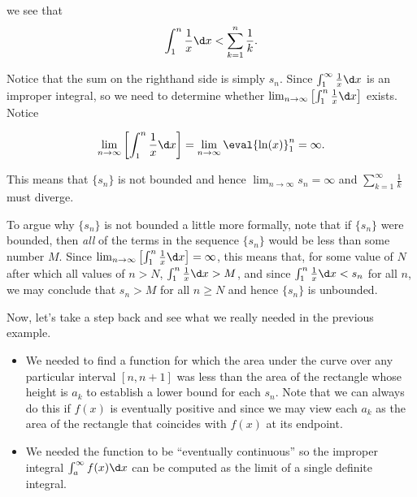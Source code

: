 \documentclass{ximera}
\begin{document}
\begin{model}
\begin{image}
\end{image}
we see that
\[
\int_1^n \frac{1}{x} \d x < \sum_{k=1}^n \frac{1}{k}.
\]

Notice that the sum on the righthand side is simply $s_n$.  Since $\int_1^{\infty} \frac{1}{x} \d x$ is an improper integral, so we need to determine whether $\lim_{n \to \infty} \left[ \int_1^n \frac{1}{x} \d x \right]$ exists.  Notice

\[
\lim_{n \to \infty} \left[ \int_1^n \frac{1}{x} \d x \right] = \lim_{n \to \infty} \eval{\ln(x)}_1^n = \infty. 
\]

This means that $\{s_n\}$ is not bounded and hence $\lim_{n \to \infty} s_n = \infty$ and $\sum_{k=1}^{\infty} \frac{1}{k}$ must diverge.  

\begin{remark}
To argue why $\{s_n\}$ is not bounded a little more formally, note that if $\{s_n\}$ were bounded, then \emph{all} of the terms in the sequence $\{s_n\}$ would be less than some number $M$.  Since $\lim_{n \to \infty} \left[ \int_1^n \frac{1}{x} \d x \right] =  \infty$, this means that, for some value of $N$ after which all values of $n>N$, $ \int_1^n \frac{1}{x} \d x > M$, and since $\int_1^n \frac{1}{x} \d x < s_n$ for all $n$, we may conclude that $s_n >M$ for all $n\geq N$ and hence $\{s_n\}$ is unbounded.
\end{remark}

\end{model}

Now, let's take a step back and see what we really needed in the previous example.

\begin{itemize}
\item We needed to find a function for which the area under the curve over any particular interval $[n,n+1]$ was less than the area of the rectangle whose height is $a_k$ to establish a lower bound for each $s_n$.  Note that we can always do this if $f(x)$ is eventually positive and  since we may view each $a_k$ as the area of the rectangle that coincides with $f(x)$ at its  endpoint.
\item We needed the function to be ``eventually continuous'' so the improper integral $\int_{a}^{\infty} f(x) \d x$ can be computed as the limit of a single definite integral.
\end{itemize}
\end{document}
